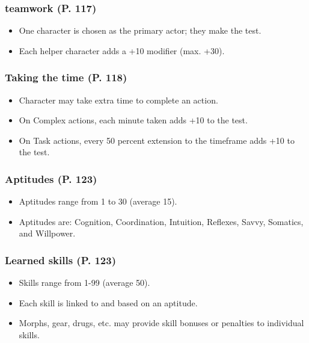 \subsubsection{teamwork (P. 117)} 

\begin{itemize} \item One character is chosen as the primary actor; they make the test. \item Each helper character adds a +10 modifier (max. +30). \end{itemize} 

\subsubsection{Taking the time (P. 118)} 

\begin{itemize} \item Character may take extra time to complete an action. \item On Complex actions, each minute taken adds +10 to the test. \item On Task actions, every 50 percent extension to the timeframe adds +10 to the test. \end{itemize} 

\subsubsection{Aptitudes (P. 123)} 

\begin{itemize} \item Aptitudes range from 1 to 30 (average 15). \item Aptitudes are: Cognition, Coordination, Intuition, Reflexes, Savvy, Somatics, and Willpower. \end{itemize} 

\subsubsection{Learned skills (P. 123)} 

\begin{itemize} \item Skills range from 1-99 (average 50). \item Each skill is linked to and based on an aptitude. \item Morphs, gear, drugs, etc. may provide skill bonuses or penalties to individual skills. \end{itemize} 

